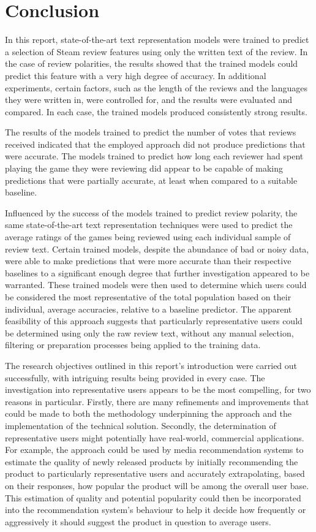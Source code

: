\chapter{Conclusion} \label{sec:Conc}

In this report, state-of-the-art text representation models were trained to predict a selection of Steam review features using only the written text of the review. In the case of review polarities, the results showed that the trained models could predict this feature with a very high degree of accuracy. In additional experiments, certain factors, such as the length of the reviews and the languages they were written in, were controlled for, and the results were evaluated and compared. In each case, the trained models produced consistently strong results.

The results of the models trained to predict the number of votes that reviews received indicated that the employed approach did not produce predictions that were accurate. The models trained to predict how long each reviewer had spent playing the game they were reviewing did appear to be capable of making predictions that were partially accurate, at least when compared to a suitable baseline.

Influenced by the success of the models trained to predict review polarity, the same state-of-the-art text representation techniques were used to predict the average ratings of the games being reviewed using each individual sample of review text. Certain trained models, despite the abundance of bad or noisy data, were able to make predictions that were more accurate than their respective baselines to a significant enough degree that further investigation appeared to be warranted. These trained models were then used to determine which users could be considered the most representative of the total population based on their individual, average accuracies, relative to a baseline predictor. The apparent feasibility of this approach suggests that particularly representative users could be determined using only the raw review text, without any manual selection, filtering or preparation processes being applied to the training data.

The research objectives outlined in this report's introduction were carried out successfully, with intriguing results being provided in every case. The investigation into representative users appears to be the most compelling, for two reasons in particular. Firstly, there are many refinements and improvements that could be made to both the methodology underpinning the approach and the implementation of the technical solution. Secondly, the determination of representative users might potentially have real-world, commercial applications. For example, the approach could be used by media recommendation systems to estimate the quality of newly released products by initially recommending the product to particularly representative users and accurately extrapolating, based on their responses, how popular the product will be among the overall user base. This estimation of quality and potential popularity could then be incorporated into the recommendation system's behaviour to help it decide how frequently or aggressively it should suggest the product in question to average users.
 
